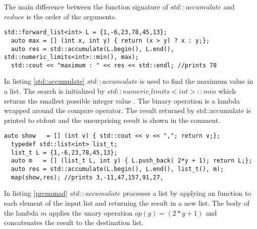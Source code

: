 \documentclass[12pt,fleqn]{article}
\begin{document}
\begin{comment}
\[
\begin{array}{rll}
\mbox{template}<&\mbox{typename}\; input\_container\_iterator, \\
               &\mbox{typename}  \; T \\
             &\mbox{typename} \; binary\_operation >&\\
T \;& \mbox{\bf accumulate}\\
&( input\_container\_iterator\; begin, \\
& input\_container\_iterator\; end, \\
& T \; initial\_value, \\
& binary\_operation \; binary_{op} );
\end{array}
\]
\end{comment}
%
The main difference between the function signature of $std::accumulate$ and $reduce$ is the order of the arguments.
\begin{lstlisting}[caption=example of std::accumulate,label=std::accumulate]
std::forward_list<int> L = {1,-6,23,78,45,13};
  auto max = [] (int x, int y) { return (x > y) ? x : y;};
  auto res = std::accumulate(L.begin(), L.end(), std::numeric_limits<int>::min(), max);
  std::cout << "maximum : " << res << std::endl; //prints 78
\end{lstlisting}
In listing \ref{std::accumulate} $std::accumulate$ is used to find the maximum value in a list.
The search is initialized by $std::numeric\_limits<int>::min$ which returns the smallest possible integer value \cite{josuttis}.
The binary operation is a lambda wrapped around the compare operator.
The result returned by std::accumulate is printed to stdout and the unsurprising result is shown in the comment.
%
\begin{lstlisting}[caption=processing a list using reduce,label=premonad]
 auto show   = [] (int v) { std::cout << v << ","; return v;};
  typedef std::list<int> list_t;
  list_t L = {1,-6,23,78,45,13};
  auto m   = [] (list_t L, int y) { L.push_back( 2*y + 1); return L;};
  auto res = std::accumulate(L.begin(), L.end(), list_t(), m);
  map(show,res); //prints 3,-11,47,157,91,27,
\end{lstlisting}
%
In listing \ref{premonad} $std::accumulate$ processes a list by applying an function to each element of the input list and returning the result in a new list.
The body of the lambda $m$ applies the unary operation $op(y)=(2*y+1)$ and concatenates the result to the destination list. 
\end{document}
